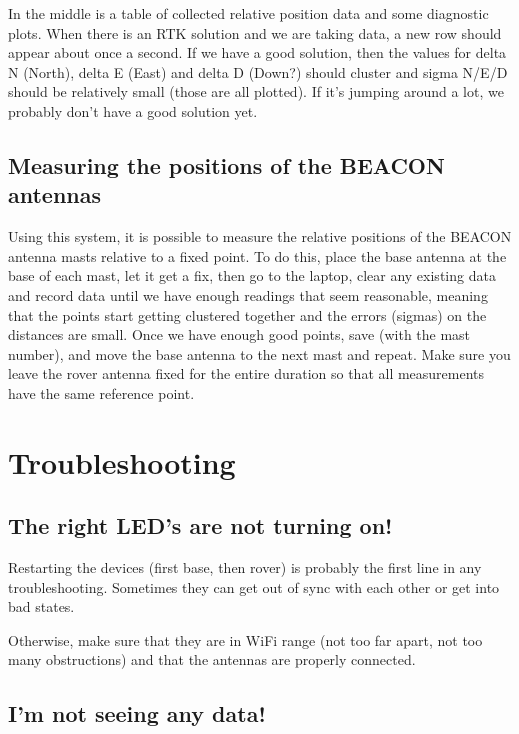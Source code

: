 \documentclass[usletter]{article}
\begin{document}
In the middle is a table of collected relative position data and some diagnostic plots. When there is an RTK solution and we are taking data, a new row should appear about once a second. If we have a good solution, then the values for delta N (North), delta E (East) and delta D (Down?) should cluster and sigma N/E/D should be relatively small (those are all plotted). If it's jumping around a lot, we probably don't have a good solution yet. 

\subsection{Measuring the positions of the BEACON antennas} 

Using this system, it is possible to measure the relative positions of the BEACON antenna masts relative to a fixed point. To do this, place the base antenna at the base of each mast, let it get a fix, then go to the laptop, clear any existing data and record data until we have enough readings that seem reasonable, meaning  that the points start getting clustered together and the errors (sigmas) on the distances are small. Once we have enough good points, save (with the mast number), and move the base antenna to the next mast and repeat. Make sure you leave the rover antenna fixed for the entire duration so that all measurements have the same reference point. 

\section{Troubleshooting} 

\subsection{The right LED's are not turning on!} 

Restarting the devices (first base, then rover) is probably the first line in any troubleshooting. Sometimes they can get out of sync with each other or get into bad states. 

Otherwise, make sure that they are in WiFi range (not too far apart, not too many obstructions) and that the antennas are properly connected. 

\subsection{I'm not seeing any data!}
\end{document}
